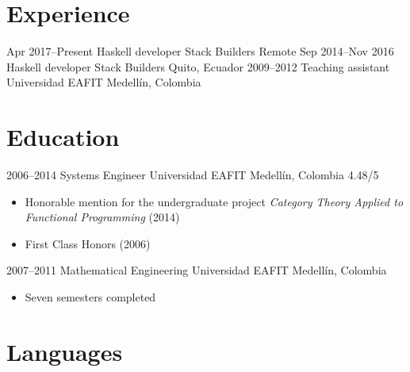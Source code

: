 \documentclass[12pt,letterpaper,sans]{moderncv}
\begin{document}
\makecvtitle

\section{Experience}

\cventry
  {Apr 2017--Present}
  {Haskell developer}
  {Stack Builders}
  {Remote}
  {}
  {}
\cventry
  {Sep 2014--Nov 2016}
  {Haskell developer}
  {Stack Builders}
  {Quito, Ecuador}
  {}
  {}
\cventry
  {2009--2012}
  {Teaching assistant}
  {Universidad EAFIT}
  {Medellín, Colombia}
  {}
  {}

\section{Education}

\cventry
  {2006--2014}
  {Systems Engineer}
  {Universidad EAFIT}
  {Medellín, Colombia}
  {4.48/5}
  {
    \begin{itemize}
    \item
      Honorable mention for the undergraduate project \emph{Category
        Theory Applied to Functional Programming} (2014)
    \item
      First Class Honors (2006)
    \end{itemize}
  }
\cventry
  {2007--2011}
  {Mathematical Engineering}
  {Universidad EAFIT}
  {Medellín, Colombia}
  {}
  {
    \begin{itemize}
    \item
      Seven semesters completed
    \end{itemize}
  }

\section{Languages}

\end{document}
